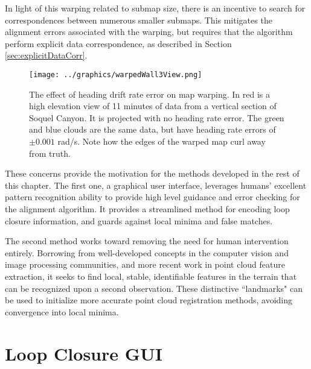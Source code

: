 In light of this warping related to submap size, there is an incentive to search for correspondences between numerous smaller submaps. This mitigates the alignment errors associated with the warping, but requires that the algorithm perform explicit data correspondence, as described in Section \ref{sec:explicitDataCorr}.

 \begin{figure}[htb]
   \centering
   \texttt{[image: ../graphics/warpedWall3View.png]} %
   \caption{The effect of heading drift rate error on map warping. In red is a high elevation view of 11 minutes of data from a vertical section of Soquel Canyon. It is projected with no heading rate error. The green and blue clouds are the same data, but have heading rate errors of $\pm0.001$ rad/s. Note how the edges of the warped map curl away from truth.}
   \label{fig:motionErrorWarping}
\end{figure}


These concerns provide the motivation for the methods developed in the rest of this chapter. The first one, a graphical user interface, leverages humans' excellent pattern recognition ability to provide high level guidance and error checking for the alignment algorithm. It provides a streamlined method for encoding loop closure information, and guards against local minima and false matches. 

The second method works toward removing the need for human intervention entirely. Borrowing from well-developed concepts in the computer vision and image processing communities, and more recent work in point cloud feature extraction, it seeks to find local, stable, identifiable features in the terrain that can be recognized upon a second observation. These distinctive ``landmarks" can be used to initialize more accurate point cloud registration methods, avoiding convergence into local minima. 


\section{Loop Closure GUI}
\label{sec:GUI}

